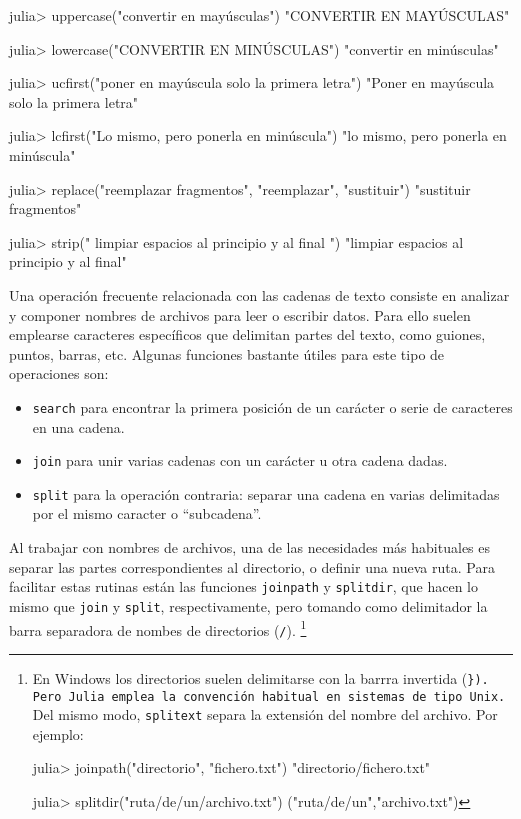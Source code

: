 ﻿\documentclass{article}
\newcommand{\jl}{\texttt}
\begin{document}
{julia> uppercase("convertir en mayúsculas")
"CONVERTIR EN MAYÚSCULAS"

julia> lowercase("CONVERTIR EN MINÚSCULAS")
"convertir en minúsculas"

julia> ucfirst("poner en mayúscula solo la primera letra")
"Poner en mayúscula solo la primera letra"

julia> lcfirst("Lo mismo, pero ponerla en minúscula")
"lo mismo, pero ponerla en minúscula"

julia> replace("reemplazar fragmentos", "reemplazar", "sustituir")
"sustituir fragmentos"

julia> strip("   limpiar espacios al principio y al final   ")
"limpiar espacios al principio y al final"

Una operación frecuente relacionada con las cadenas de texto consiste en analizar y componer nombres de archivos para leer o escribir datos. Para ello suelen emplearse caracteres específicos que delimitan partes del texto, como guiones, puntos, barras, etc. Algunas funciones bastante útiles para este tipo de operaciones son:

\begin{itemize}
  \item \jl{search} para encontrar la primera posición de un carácter o serie de caracteres en una cadena.
  \item \jl{join} para unir varias cadenas con un carácter u otra cadena dadas.
  \item \jl{split} para la operación contraria: separar una cadena en varias delimitadas por el mismo caracter o ``subcadena''.
\end{itemize}

Al trabajar con nombres de archivos, una de las necesidades más habituales es separar las partes correspondientes al directorio, o definir una nueva ruta. Para facilitar estas rutinas están las funciones \jl{joinpath} y \jl{splitdir}, que hacen lo mismo que \jl{join} y \jl{split}, respectivamente, pero tomando como delimitador la barra separadora de nombes de directorios (\jl{/}).%
\footnote{%
En Windows los directorios suelen delimitarse con la barrra invertida (\jl{\}). Pero Julia emplea la convención habitual en sistemas de tipo Unix.%
}
Del mismo modo, \jl{splitext} separa la extensión del nombre del archivo. Por ejemplo:

julia> joinpath("directorio", "fichero.txt")
"directorio/fichero.txt"

julia> splitdir("ruta/de/un/archivo.txt")
("ruta/de/un","archivo.txt")

}}
\end{document}

